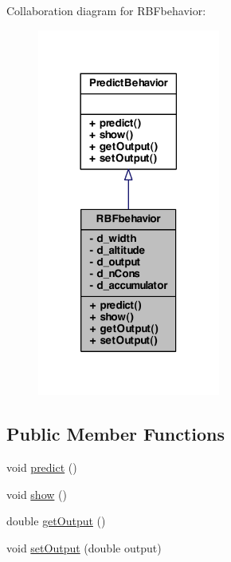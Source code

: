Collaboration diagram for RBFbehavior:
\nopagebreak
\begin{figure}[H]
\begin{center}
\leavevmode
\includegraphics[width=170pt]{class_r_b_fbehavior__coll__graph}
\end{center}
\end{figure}
\subsection*{Public Member Functions}
\begin{DoxyCompactItemize}
\item 
void \hyperlink{class_r_b_fbehavior_ac14521848163e04810a6d038aef81896}{predict} ()
\item 
void \hyperlink{class_r_b_fbehavior_a96b123a5b657e46946c3ff98ea78f5de}{show} ()
\item 
double \hyperlink{class_r_b_fbehavior_a9faeb38a3db00dd07fb29e012eb03b0c}{getOutput} ()
\item 
void \hyperlink{class_r_b_fbehavior_a691b3a38f3b7b3a663c5380e32d2a777}{setOutput} (double output)
\end{DoxyCompactItemize}
